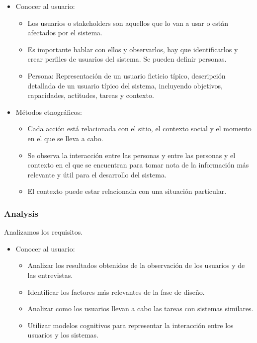 \documentclass[12pt, twoside, openright]{report} %
\begin{document}
\begin{itemize}
	\item Conocer al usuario:

	      \begin{itemize}
		      \item Los usuarios o stakeholders son aquellos que lo van a usar o
		            están afectados por el sistema.

		      \item Es importante hablar con ellos y observarlos, hay que
		            identificarlos y crear perfiles de usuarios del sistema. Se
		            pueden definir personas.

		      \item Persona: Representación de un usuario ficticio típico,
		            descripción detallada de un usuario típico del sistema,
		            incluyendo objetivos, capacidades, actitudes, tareas y contexto.
	      \end{itemize}
	\item Métodos etnográficos:

	      \begin{itemize}
		      \item Cada acción está relacionada con el sitio, el contexto social y
		            el momento en el que se lleva a cabo.

		      \item Se observa la interacción entre las personas y entre las
		            personas y el contexto en el que se encuentran para tomar nota
		            de la información más relevante y útil para el desarrollo del
		            sistema.

		      \item El contexto puede estar relacionada con una situación particular.
	      \end{itemize}
\end{itemize}
\subsubsection{Analysis}
Analizamos los requisitos.

\begin{itemize}
	\item Conocer al usuario:

	      \begin{itemize}
		      \item Analizar los resultados obtenidos de la observación de los
		            usuarios y de las entrevistas.

		      \item Identificar los factores más relevantes de la fase de diseño.

		      \item Analizar como los usuarios llevan a cabo las tareas con sistemas
		            similares.

		      \item Utilizar modelos cognitivos para representar la interacción
		            entre los usuarios y los sistemas.
	      \end{itemize}
\end{itemize}
\end{document}
